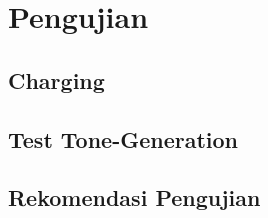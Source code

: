 \documentclass[12pt]{book}
\begin{document}
    \chapter{Pengujian}

    \section{Charging}

    \section{Test Tone-Generation}

    \section{Rekomendasi Pengujian}
\end{document}

